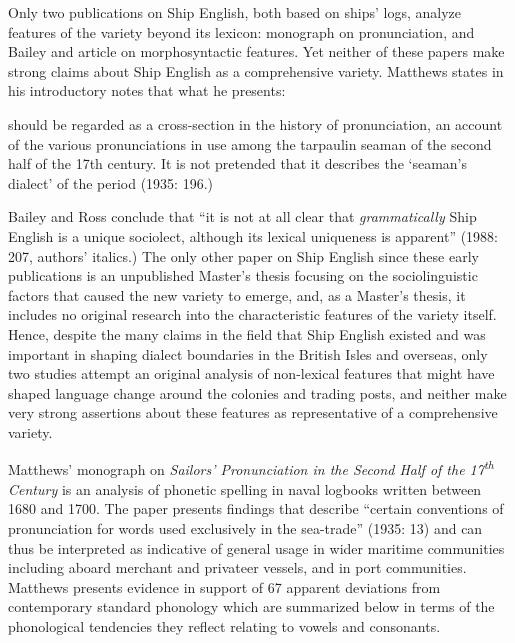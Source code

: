 Only two publications on Ship English, both based on ships’ logs, analyze features of the variety beyond its lexicon: \citet{Matthews1935} monograph on pronunciation, and Bailey and  article on morphosyntactic features. Yet neither of these papers make strong claims about Ship English as a comprehensive variety. Matthews states in his introductory notes that what he presents:

should be regarded as a cross-section in the history of pronunciation, an account of the various pronunciations in use among the tarpaulin seaman of the second half of the 17th century. It is not pretended that it describes the ‘seaman’s dialect’ of the period (1935: 196.)

Bailey and Ross conclude that “it is not at all clear that \textit{grammatically} Ship English is a unique sociolect, although its lexical uniqueness is apparent” (1988: 207, authors’ italics.) The only other paper on Ship English since these early publications is an unpublished Master’s thesis \citep{Schultz2010} focusing on the sociolinguistic factors that caused the new variety to emerge, and, as a Master’s thesis, it includes no original research into the characteristic features of the variety itself. Hence, despite the many claims in the field that Ship English existed and was important in shaping dialect boundaries in the British Isles and overseas, only two studies attempt an original analysis of non-lexical features that might have shaped language change around the colonies and trading posts, and neither make very strong assertions about these features as representative of a comprehensive variety.  

Matthews’ monograph on \textit{Sailors’ Pronunciation in the Second Half of the 17\textsuperscript{th} Century} is an analysis of phonetic spelling in naval logbooks written between 1680 and 1700. The paper presents findings that describe “certain conventions of pronunciation for words used exclusively in the sea-trade” (1935: 13) and can thus be interpreted as indicative of general usage in wider maritime communities including aboard merchant and privateer vessels, and in port communities. Matthews presents evidence in support of 67 apparent deviations from contemporary standard phonology which are summarized below in terms of the phonological tendencies they reflect relating to vowels and consonants. 

